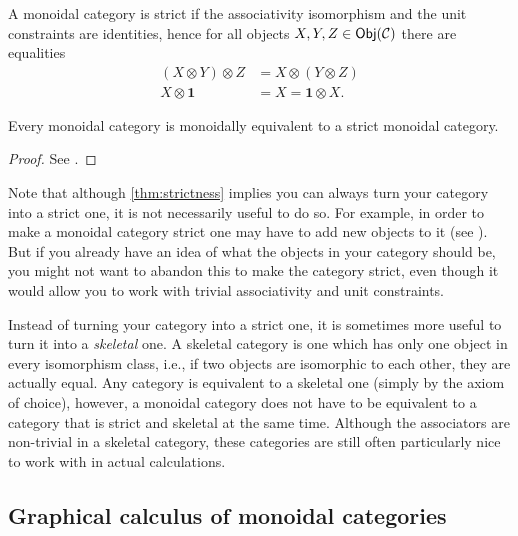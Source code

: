 	\begin{defn}[Strict]
		A monoidal category is strict if the associativity isomorphism and the unit constraints are identities, hence for all objects $X,Y,Z\in\mathsf{Obj}({\mathcal{C}})$ there are equalities
			\begin{align}
				(X\otimes Y)\otimes Z&=X\otimes(Y\otimes Z)\\
				X\otimes\mathbf{1}&=X=\mathbf{1}\otimes X.
			\end{align}
	\end{defn}

	\begin{thm}
		\label{thm:strictness}
		Every monoidal category is monoidally equivalent to a strict monoidal category.
	\end{thm}

	\begin{proof}
		See \cite[Theorem 2.8.5]{Etingof2015}.
	\end{proof}

	\begin{rem}
		Note that although \cref{thm:strictness} implies you can always turn your category into a strict one, it is not necessarily useful to do so. For example, in order to make a monoidal category strict one may have to add new objects to it (see \cite[Remark 2.8.6]{Etingof2015}). But if you already have an idea of what the objects in your category should be, you might not want to abandon this to make the category strict, even though it would allow you to work with trivial associativity and unit constraints.
	\end{rem}

	\begin{rem}
		Instead of turning your category into a strict one, it is sometimes more useful to turn it into a \emph{skeletal} one. A skeletal category is one which has only one object in every isomorphism class, i.e., if two objects are isomorphic to each other, they are actually equal. Any category is equivalent to a skeletal one (simply by the axiom of choice), however, a monoidal category does not have to be equivalent to a category that is strict and skeletal at the same time. Although the associators are non-trivial in a skeletal category, these categories are still often particularly nice to work with in actual calculations.
	\end{rem}


\subsection*{Graphical calculus of monoidal categories}


